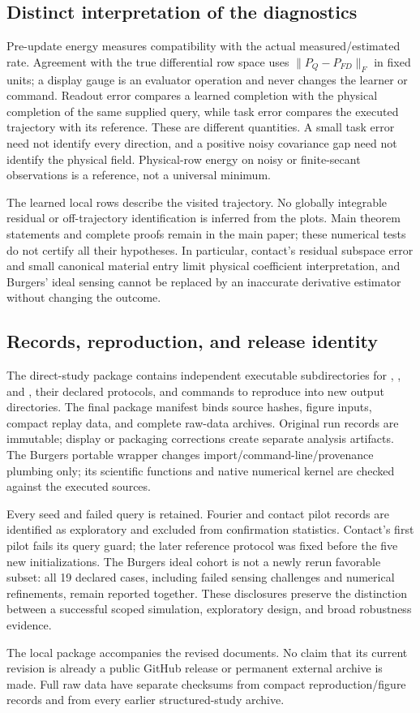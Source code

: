 \subsection{Distinct interpretation of the diagnostics}
Pre-update energy measures compatibility with the actual measured/estimated
rate. Agreement with the true differential row space uses
$\|P_Q-P_{FD}\|_F$ in fixed units; a display gauge
is an evaluator operation and never changes the learner or command.
Readout error compares a learned completion with the physical completion of
the same supplied query, while task error compares the executed trajectory
with its reference. These are different quantities. A small task error need
not identify every direction, and a positive noisy covariance gap need not
identify the physical field. Physical-row energy on noisy or finite-secant
observations is a reference, not a universal minimum.

The learned local rows describe the visited trajectory. No globally
integrable residual or off-trajectory identification is inferred from the
plots. Main theorem statements and complete proofs remain in the main paper;
these numerical tests do not certify all their hypotheses. In particular,
contact's residual subspace error and small canonical material entry limit
physical coefficient interpretation, and Burgers' ideal sensing cannot be
replaced by an inaccurate derivative estimator without changing the outcome.





\subsection{Records, reproduction, and release identity}
The direct-study package contains independent executable subdirectories for
, , and , their declared
protocols, and commands to reproduce into new output directories. The final
package manifest binds source hashes, figure inputs, compact replay data,
and complete raw-data archives. Original run records are immutable; display
or packaging corrections create separate analysis artifacts. The Burgers
portable wrapper changes import/command-line/provenance plumbing only;
its scientific functions and native numerical kernel are checked against
the executed sources.

Every seed and failed query is retained. Fourier and contact pilot records
are identified as exploratory and excluded from confirmation statistics.
Contact's first pilot fails its query guard; the later reference protocol
was fixed before the five new initializations. The Burgers ideal cohort is
not a newly rerun favorable subset: all 19 declared cases, including failed
sensing challenges and numerical refinements, remain reported together.
These disclosures preserve the distinction between a successful scoped
simulation, exploratory design, and broad robustness evidence.

The local package accompanies the revised documents. No claim that its
current revision is already a public GitHub release or permanent external
archive is made. Full raw data have separate checksums from compact
reproduction/figure records and from every earlier structured-study archive.
